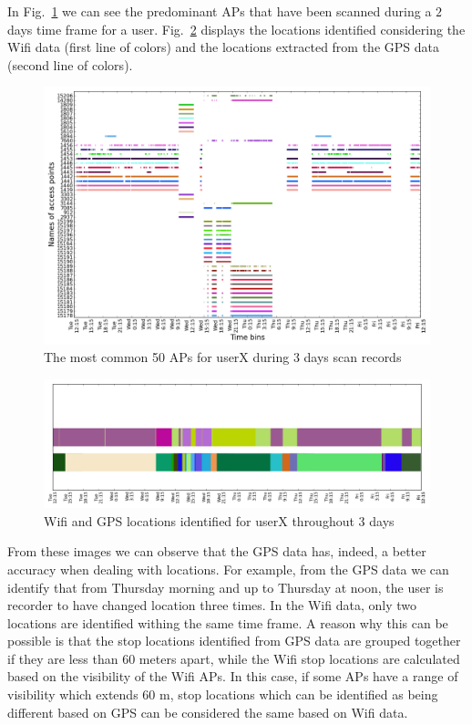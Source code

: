 In Fig.~\ref{user6_aps_2days} we can see the predominant APs that have been
scanned during a $2$ days time frame for a user. Fig.~\ref{user6_hmm_2days}
displays the locations identified considering the Wifi data (first line of
colors) and the locations extracted from the GPS data (second line of colors).

\begin{figure}[!h]
\centering
\includegraphics[width=\textwidth]{figures/gps/user_6_sorted_3days_no_rssi_plot.png}
\caption{The most common 50 APs for userX during 3 days scan records}
\label{user6_aps_2days}
\end{figure}

\begin{figure}[!h]
\centering
\includegraphics[width=\textwidth]{figures/gps/user_6_hmm_and_gps.png}
\caption{Wifi and GPS locations identified for userX throughout 3 days}
\label{user6_hmm_2days}
\end{figure}

From these images we can observe that the GPS data has, indeed, a better
accuracy when dealing with locations. For example, from the GPS data we can
identify that from Thursday morning and up to Thursday at noon, the user is
recorder to have changed location three times. In the Wifi data, only two
locations are identified withing the same time frame. A reason why this can be
possible is that the stop locations identified from GPS data are grouped
together if they are less than $60$ meters apart, while the Wifi stop locations
are calculated based on the visibility of the Wifi APs. In this case, if some
APs have a range of visibility which extends $60$ m, stop locations which can be
identified as being different based on GPS can be considered the same based on
Wifi data.

